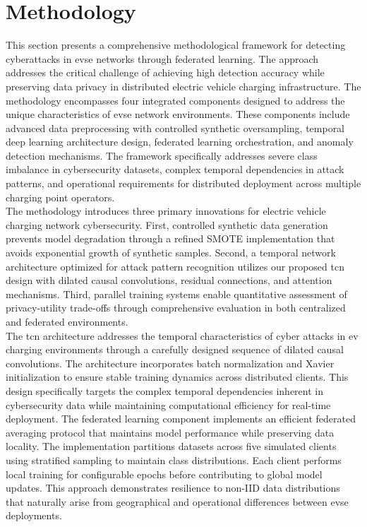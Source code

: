 \section{Methodology}
\label{section:methodology}
This section presents a comprehensive methodological framework for detecting cyberattacks in \gls{evse} networks through federated learning. The approach addresses the critical challenge of achieving high detection accuracy while preserving data privacy in distributed electric vehicle charging infrastructure. The methodology encompasses four integrated components designed to address the unique characteristics of \gls{evse} network environments. These components include advanced data preprocessing with controlled synthetic oversampling, temporal deep learning architecture design, federated learning orchestration, and anomaly detection mechanisms. The framework specifically addresses severe class imbalance in cybersecurity datasets, complex temporal dependencies in attack patterns, and operational requirements for distributed deployment across multiple charging point operators. \\

The methodology introduces three primary innovations for electric vehicle charging network cybersecurity. First, controlled synthetic data generation prevents model degradation through a refined SMOTE implementation that avoids exponential growth of synthetic samples. Second, a temporal network architecture optimized for attack pattern recognition utilizes our proposed \gls{tcn} design with dilated causal convolutions, residual connections, and attention mechanisms. Third, parallel training systems enable quantitative assessment of privacy-utility trade-offs through comprehensive evaluation in both centralized and federated environments. \\

The \gls{tcn} architecture addresses the temporal characteristics of cyber attacks in \gls{ev} charging environments through a carefully designed sequence of dilated causal convolutions. The architecture incorporates batch normalization and Xavier initialization to ensure stable training dynamics across distributed clients. This design specifically targets the complex temporal dependencies inherent in cybersecurity data while maintaining computational efficiency for real-time deployment. The federated learning component implements an efficient federated averaging protocol that maintains model performance while preserving data locality. The implementation partitions datasets across five simulated clients using stratified sampling to maintain class distributions. Each client performs local training for configurable epochs before contributing to global model updates. This approach demonstrates resilience to non-IID data distributions that naturally arise from geographical and operational differences between \gls{evse} deployments. \\

